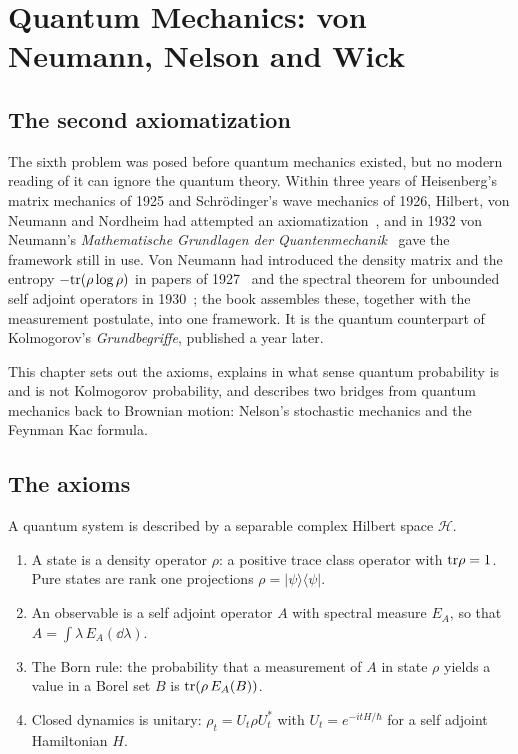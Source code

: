 \chapter{Quantum Mechanics: von Neumann, Nelson and Wick}
\label{ch:quantum}

\section{The second axiomatization}

The sixth problem was posed before quantum mechanics existed, but no modern reading of it can ignore the quantum theory. Within three years of Heisenberg's matrix mechanics of 1925 and Schr\"odinger's wave mechanics of 1926, Hilbert, von Neumann and Nordheim had attempted an axiomatization~\cite{hilbertvnn1928}, and in 1932 von Neumann's \emph{Mathematische Grundlagen der Quantenmechanik}~\cite{vonneumann1932} gave the framework still in use. Von Neumann had introduced the density matrix and the entropy $-\mathrm{tr}(\rho\log\rho)$ in papers of 1927~\cite{vonneumann1927a,vonneumann1927b} and the spectral theorem for unbounded self adjoint operators in 1930~\cite{vonneumann1930}; the book assembles these, together with the measurement postulate, into one framework. It is the quantum counterpart of Kolmogorov's \emph{Grundbegriffe}, published a year later.

This chapter sets out the axioms, explains in what sense quantum probability is and is not Kolmogorov probability, and describes two bridges from quantum mechanics back to Brownian motion: Nelson's stochastic mechanics and the Feynman Kac formula.

\section{The axioms}

\begin{definition}
A quantum system is described by a separable complex Hilbert space $\mathcal{H}$.
\begin{enumerate}
\item A state is a density operator $\rho$: a positive trace class operator with $\mathrm{tr}\rho = 1$. Pure states are rank one projections $\rho = |\psi\rangle\langle\psi|$.
\item An observable is a self adjoint operator $A$ with spectral measure $E_A$, so that $A = \int\lambda\,E_A(\dd\lambda)$.
\item The Born rule: the probability that a measurement of $A$ in state $\rho$ yields a value in a Borel set $B$ is $\mathrm{tr}(\rho\,E_A(B))$.
\item Closed dynamics is unitary: $\rho_t = U_t\rho U_t^*$ with $U_t = e^{-itH/\hbar}$ for a self adjoint Hamiltonian $H$.
\end{enumerate}
\end{definition}

